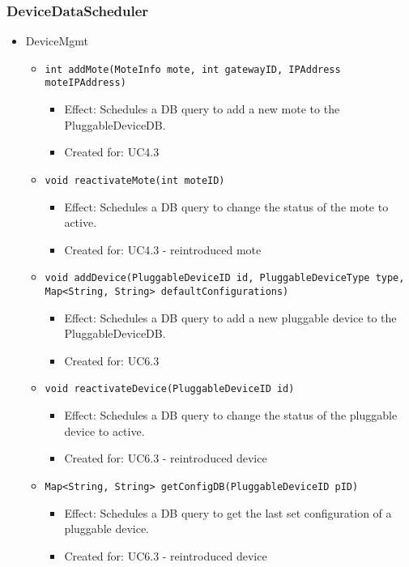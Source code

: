     \subsubsection{DeviceDataScheduler}
        \begin{itemize}
            \item DeviceMgmt
            \begin{itemize}
                \item \texttt{int addMote(MoteInfo mote, int gatewayID, IPAddress moteIPAddress)}
                    \begin{itemize}
                        \item Effect: Schedules a DB query to add a new mote to the PluggableDeviceDB.
                        \item Created for: UC4.3
                    \end{itemize}
                \item \texttt{void reactivateMote(int moteID)}
                    \begin{itemize}
                        \item Effect: Schedules a DB query to change the status of the mote to active.
                        \item Created for: UC4.3 - reintroduced mote
                    \end{itemize}
                \item \texttt{void addDevice(PluggableDeviceID id, PluggableDeviceType type, Map<String, String> defaultConfigurations)}
                    \begin{itemize}
                        \item Effect: Schedules a DB query to add a new pluggable device to the PluggableDeviceDB.
                        \item Created for: UC6.3
                    \end{itemize}
                \item \texttt{void reactivateDevice(PluggableDeviceID id)}
                    \begin{itemize}
                        \item Effect: Schedules a DB query to change the status of the pluggable device to active.
                        \item Created for: UC6.3 - reintroduced device
                    \end{itemize}
                \item \texttt{Map<String, String> getConfigDB(PluggableDeviceID pID)}
                    \begin{itemize}
                        \item Effect: Schedules a DB query to get the last set configuration of a pluggable device.
                        \item Created for: UC6.3 - reintroduced device
                    \end{itemize}
            \end{itemize}


\end{itemize}
